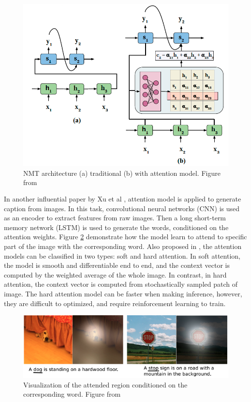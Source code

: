 \documentclass[journal]{IEEEtran}
\begin{document}
\begin{figure}[htb]
  \centering
  \includegraphics[width=0.7\columnwidth]{NMT.png}
  \caption{NMT architecture (a) traditional (b) with attention model.
  Figure from \cite{chaudhari1904attentive}}
  \label{NMT}
\end{figure}

In another influential paper by Xu et al \cite{xu2015show}, attention model is applied to generate caption from images. 
In this task, convolutional neural networks (CNN) is used as an encoder to extract features from raw images.
Then a long short-term memory network (LSTM) is used to generate the words, conditioned on the attention weights.
Figure \ref{attention} demonstrate how the model learn to attend to specific part of the image with the corresponding word. 
Also proposed in \cite{xu2015show}, the attention models can be classified in two types: soft and hard attention. 
In soft attention, the model is smooth and differentiable end to end, and the context vector is computed by the weighted average of the whole image. 
In contrast, in hard attention, the context vector is computed from stochastically sampled patch of image. 
The hard attention model can be faster when making inference, however, they are difficult to optimized, and require reinforcement learning to train.

\begin{figure}[htb]
  \includegraphics[width=\linewidth]{attention.png}
  \caption{Visualization of the attended region conditioned on the corresponding word.
  Figure from \cite{xu2015show}}
  \label{attention}
\end{figure}
\end{document}
